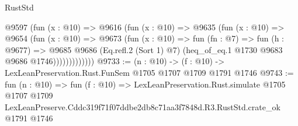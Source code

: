 \begin{lexlean}{RustStd}
\begin{coremodule}
                @9597
                  (fun (x : @10) =>
                  @9616
                    (fun (x : @10) =>
                    @9635
                      (fun (x : @10) =>
                      @9654
                        (fun (x : @10) =>
                        @9673
                          (fun (x : @10) =>
                          fun (fn : @7) =>
                          fun (h : @9677) =>
                          @9685
                            @9686
                            (Eq.refl.{2} (Sort 1) @7)
                            (heq_of_eq.{1} @1730 @9683 @9686 @1746)))))))))))))
@9733 := (n : @10) -> (f : @10) -> LexLeanPreservation.Rust.FunSem @1705 @1707 @1709 @1791 @1746
@9743 := fun (n : @10) =>
  fun (f : @10) =>
  LexLeanPreservation.Rust.simulate
    @1705
    @1707
    @1709
    LexLeanPreserve.Cddc319f71f07ddbe2db8c71aa3f7848d.R3.RustStd.crate_ok
    @1791
    @1746
\end{coremodule}
\end{lexlean}
